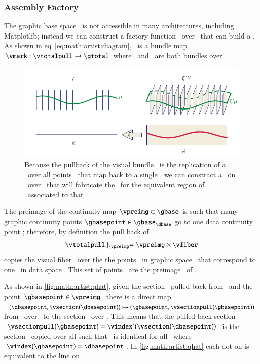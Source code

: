 \documentclass[journal]{vgtc}                %
\begin{document}
\subsubsection{Assembly Factory}
The graphic base space \gbase\ is not accessible in many architectures, including Matplotlib; instead we can construct a factory function \vmarkd\ over \dbase\ that can build a \vmark. As shown in eq~\ref{eq:math:artist:diagram}, \vmark\ is a bundle map $\vmark: \vtotalpull\rightarrow \gtotal$ where \vtotalpull\ and \gtotal\ are both bundles over \gbase.
\begin{figure}[htb]
  \centering
    \includegraphics[width=1\columnwidth]{q_hat.png}
    \caption{Because the pullback of the visual bundle \vtotalpull\ is the replication of a \vsection\ over all points \gbasepoint\ that map back to a single \dbasepoint, we can constract a \vmarkd\ on \vsection\ over \dbasepoint\ that will fabricate the \vmark\ for the equivalent region of \gbasepoint\ associated to that \dbasepoint}
    \label{fig:math:artist:qhat}
\end{figure}

The preimage of the continuity map $\vpreimg \subset \gbase$ is such that many graphic continuity points $\gbasepoint \in \gbase_{\dbase}$ go to one data continuity point \dbasepoint; therefore, by definition the pull back of \vsection\
\begin{equation}
    \vtotalpull \mid_{\vpreimg} = \vpreimg \times \vfiber
\end{equation}
copies the visual fiber \vfiber\ over the the points \gbasepoint\ in graphic space \gbase\ that correspond to one \dbasepoint\ in data space \dbase. This set of points \gbasepoint\ are the preimage \vpreimg\ of \dbasepoint. 

As shown in \autoref{fig:math:artist:qhat}, given the section \vsectionpull\ pulled back from \vsection\ and the point $\gbasepoint \in \vpreimg$, there is a direct map $(\dbasepoint, \vsection(\dbasepoint)) \mapsto (\gbasepoint, \vsectionpull(\gbasepoint))$  from \vsection\ over \dbasepoint\ to the section \vsectionpull\ over \gbasepoint. This means that the pulled back section $\vsectionpull(\gbasepoint) = \vindex^*(\vsection(\dbasepoint))$ is the section \vsection\ copied over all \gbasepoint such that \vsectionpull\ is identical for all \gbasepoint\ where $\vindex(\gbasepoint) = \dbasepoint$. In \autoref{fig:math:artist:qhat} each dot on \vfiber is equivalent to the line on \vfiberpull. 
\end{document}
